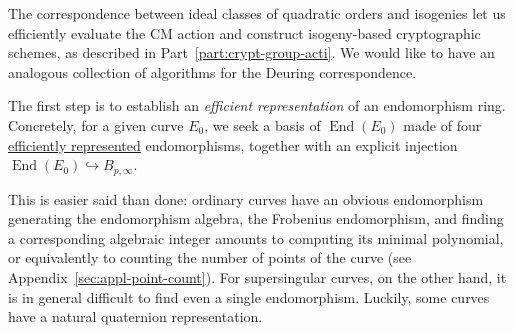\documentclass[10pt]{article}
\theoremstyle{plain}
\theoremstyle{definition}
\DeclareMathOperator{\End}{End} %
\begin{document}
The correspondence between ideal classes of quadratic orders and
isogenies let us efficiently evaluate the CM action and construct
isogeny-based cryptographic schemes, as described in
Part~\ref{part:crypt-group-acti}. %
We would like to have an analogous collection of algorithms for the
Deuring correspondence.

The first step is to establish an \emph{efficient representation} of
an endomorphism ring. %
Concretely, for a given curve $E_0$, we seek a basis of $\End(E_0)$
made of four \hyperref[def:isog-repr]{efficiently represented}
endomorphisms, together with an explicit injection
$\End(E_0) \hookrightarrow B_{p,∞}$.

This is easier said than done: ordinary curves have an obvious
endomorphism generating the endomorphism algebra, the Frobenius
endomorphism, and finding a corresponding algebraic integer amounts to
computing its minimal polynomial, or equivalently to counting the
number of points of the curve (see
Appendix~\ref{sec:appl-point-count}). %
For supersingular curves, on the other hand, it is in general
difficult to find even a single endomorphism. %
Luckily, some curves have a natural quaternion representation.
\end{document}
